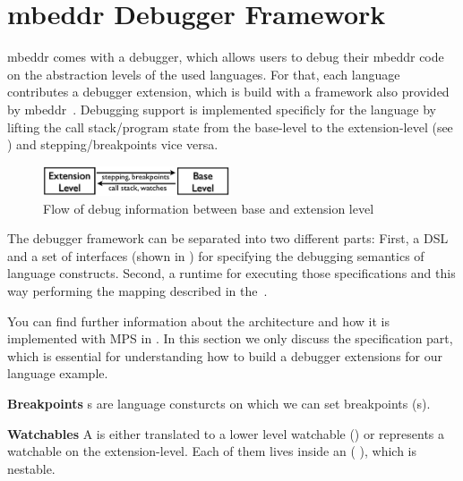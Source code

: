 \section{mbeddr Debugger Framework}
\label{mbeddrDebugger}
\label{mbeddrDebuggerFramework}

mbeddr comes with a debugger, which allows users to debug their mbeddr code 
on the abstraction levels of the used languages. For that, each language
contributes a debugger extension, which is build with a framework also provided
by mbeddr~\cite{DBLP:conf/adaEurope/AdaEuropeDeb}.
Debugging support is implemented specificly for the language by
lifting the call stack/program state from the base-level to the
extension-level (see ) and stepping/breakpoints
vice versa.

\begin{figure}[h]
  \vspace{-2mm}
  \centering
    \includegraphics[width=5.5cm]{./figures/two-levels.png} 
    \vspace{-2mm}
    \caption{Flow of debug information between base and
    extension level~\cite{DBLP:conf/adaEurope/AdaEuropeDeb}}
  \label{infoFlow}
  \vspace{-2mm}
\end{figure}



The debugger framework can be separated into two different parts: First, a
\ac{DSL} and a set of interfaces (shown in ) for specifying the
debugging semantics of language constructs. 
Second, a runtime for executing those specifications and
this way performing the mapping described in the~. 

You can find further information about the architecture and how it is
implemented with \ac{MPS} in \cite{DBLP:conf/adaEurope/AdaEuropeDeb}. In this
section we only discuss the specification part, which is essential for
understanding how to build a debugger extensions for our language example.

\noindent \textbf{Breakpoints} s are language consturcts on which
we can set breakpoints (\eg {}s).

\noindent \textbf{Watchables} A  is either
translated to a lower level watchable (\eg  {}) or
represents a watchable on the extension-level.
Each of them lives inside an  (\eg
{}), which is nestable. 

